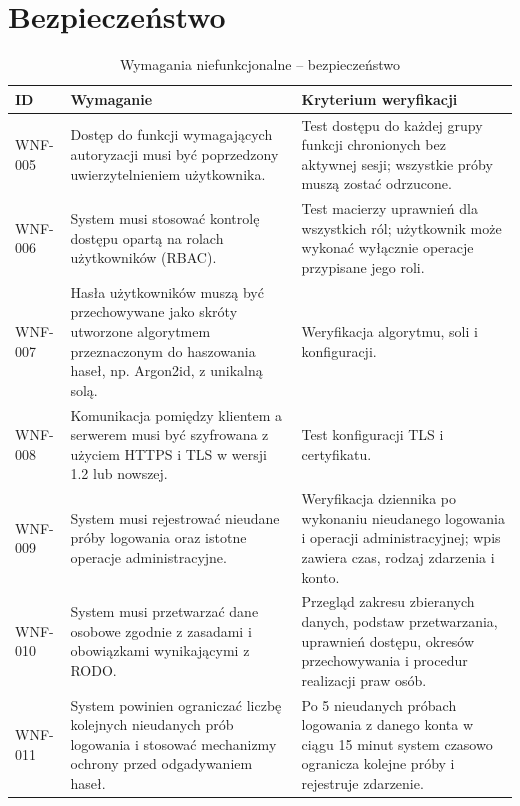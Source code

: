 \documentclass[12pt,a4paper,oneside]{report}
\begin{document}
\section{Bezpieczeństwo}
\begin{longtable}{|p{1.5cm}|p{8.4cm}|p{3.5cm}|}
\caption{Wymagania niefunkcjonalne -- bezpieczeństwo}\label{tab:wnf-bezpieczenstwo}\\\hline
\rowcolor{lightblue}\textbf{ID} & \textbf{Wymaganie} & \textbf{Kryterium weryfikacji}\\\hline
WNF-005 & Dostęp do funkcji wymagających autoryzacji musi być poprzedzony uwierzytelnieniem użytkownika. & Test dostępu do każdej grupy funkcji chronionych bez aktywnej sesji; wszystkie próby muszą zostać odrzucone.\\\hline
WNF-006 & System musi stosować kontrolę dostępu opartą na rolach użytkowników (RBAC). & Test macierzy uprawnień dla wszystkich ról; użytkownik może wykonać wyłącznie operacje przypisane jego roli.\\\hline
WNF-007 & Hasła użytkowników muszą być przechowywane jako skróty utworzone algorytmem przeznaczonym do haszowania haseł, np. Argon2id, z unikalną solą. & Weryfikacja algorytmu, soli i konfiguracji. \\\hline
WNF-008 & Komunikacja pomiędzy klientem a serwerem musi być szyfrowana z użyciem HTTPS i TLS w wersji 1.2 lub nowszej. & Test konfiguracji TLS i certyfikatu. \\\hline
WNF-009 & System musi rejestrować nieudane próby logowania oraz istotne operacje administracyjne. & Weryfikacja dziennika po wykonaniu nieudanego logowania i operacji administracyjnej; wpis zawiera czas, rodzaj zdarzenia i konto.\\\hline
WNF-010 & System musi przetwarzać dane osobowe zgodnie z zasadami i obowiązkami wynikającymi z RODO. & Przegląd zakresu zbieranych danych, podstaw przetwarzania, uprawnień dostępu, okresów przechowywania i procedur realizacji praw osób.\\\hline
WNF-011 & System powinien ograniczać liczbę kolejnych nieudanych prób logowania i stosować mechanizmy ochrony przed odgadywaniem haseł. & Po 5 nieudanych próbach logowania z danego konta w ciągu 15 minut system czasowo ogranicza kolejne próby i rejestruje zdarzenie.\\\hline
\end{longtable}
\end{document}
